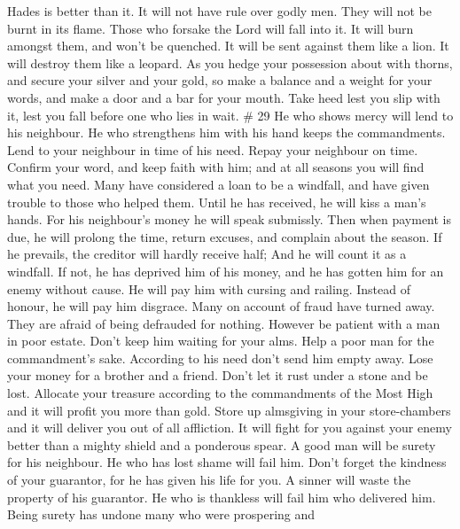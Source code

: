 Hades is better than it.  It will not have rule over godly
men. They will not be burnt in its flame.  Those who
forsake the Lord will fall into it. It will burn amongst them, and won't
be quenched. It will be sent against them like a lion. It will destroy
them like a leopard.  As you hedge your possession about
with thorns, and secure your silver and your gold,  so make
a balance and a weight for your words, and make a door and a bar for
your mouth.  Take heed lest you slip with it, lest you fall
before one who lies in wait. \# 29  He who shows mercy will
lend to his neighbour. He who strengthens him with his hand keeps the
commandments.  Lend to your neighbour in time of his need.
Repay your neighbour on time.  Confirm your word, and keep
faith with him; and at all seasons you will find what you need.
 Many have considered a loan to be a windfall, and have
given trouble to those who helped them.  Until he has
received, he will kiss a man's hands. For his neighbour's money he will
speak submissly. Then when payment is due, he will prolong the time,
return excuses, and complain about the season.  If he
prevails, the creditor will hardly receive half; And he will count it as
a windfall. If not, he has deprived him of his money, and he has gotten
him for an enemy without cause. He will pay him with cursing and
railing. Instead of honour, he will pay him disgrace.  Many
on account of fraud have turned away. They are afraid of being defrauded
for nothing.  However be patient with a man in poor estate.
Don't keep him waiting for your alms.  Help a poor man for
the commandment's sake. According to his need don't send him empty away.
 Lose your money for a brother and a friend. Don't let it
rust under a stone and be lost.  Allocate your treasure
according to the commandments of the Most High and it will profit you
more than gold.  Store up almsgiving in your store-chambers
and it will deliver you out of all affliction.  It will
fight for you against your enemy better than a mighty shield and a
ponderous spear.  A good man will be surety for his
neighbour. He who has lost shame will fail him.  Don't
forget the kindness of your guarantor, for he has given his life for
you.  A sinner will waste the property of his guarantor.
 He who is thankless will fail him who delivered him.
 Being surety has undone many who were prospering and
